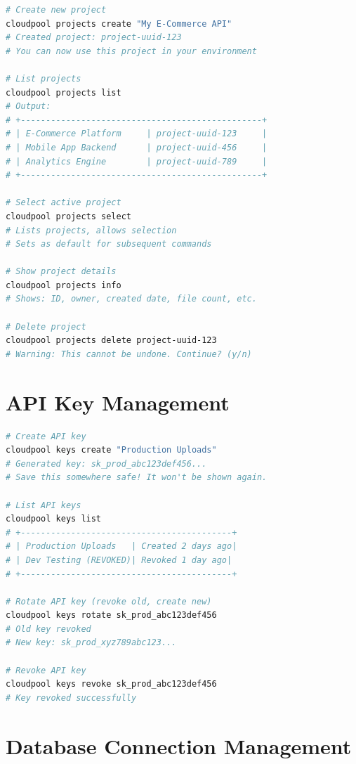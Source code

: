 \documentclass[11pt,a4paper]{report}
\begin{document}
\begin{lstlisting}[language=bash]
# Create new project
cloudpool projects create "My E-Commerce API"
# Created project: project-uuid-123
# You can now use this project in your environment

# List projects
cloudpool projects list
# Output:
# +------------------------------------------------+
# | E-Commerce Platform     | project-uuid-123     |
# | Mobile App Backend      | project-uuid-456     |
# | Analytics Engine        | project-uuid-789     |
# +------------------------------------------------+

# Select active project
cloudpool projects select
# Lists projects, allows selection
# Sets as default for subsequent commands

# Show project details
cloudpool projects info
# Shows: ID, owner, created date, file count, etc.

# Delete project
cloudpool projects delete project-uuid-123
# Warning: This cannot be undone. Continue? (y/n)
\end{lstlisting}


\section{API Key Management}


\begin{lstlisting}[language=bash]
# Create API key
cloudpool keys create "Production Uploads"
# Generated key: sk_prod_abc123def456...
# Save this somewhere safe! It won't be shown again.

# List API keys
cloudpool keys list
# +------------------------------------------+
# | Production Uploads   | Created 2 days ago|
# | Dev Testing (REVOKED)| Revoked 1 day ago|
# +------------------------------------------+

# Rotate API key (revoke old, create new)
cloudpool keys rotate sk_prod_abc123def456
# Old key revoked
# New key: sk_prod_xyz789abc123...

# Revoke API key
cloudpool keys revoke sk_prod_abc123def456
# Key revoked successfully
\end{lstlisting}


\section{Database Connection Management}
\end{document}
